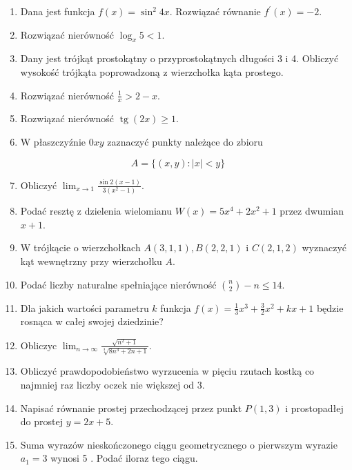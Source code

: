 \documentclass[10pt]{article}
\begin{document}
\begin{enumerate}
  \item Dana jest funkcja \(f(x)=\sin ^{2} 4 x\). Rozwiązać równanie \(f^{\prime}(x)=-2\).
  \item Rozwiązać nierówność \(\log _{x} 5<1\).
  \item Dany jest trójkąt prostokątny o przyprostokątnych długości 3 i 4. Obliczyć wysokość trójkąta poprowadzoną z wierzchołka kąta prostego.
  \item Rozwiązać nierówność \(\frac{1}{x}>2-x\).
  \item Rozwiązać nierówność \(\operatorname{tg}(2 x) \geqslant 1\).
  \item W płaszczyźnie \(0 x y\) zaznaczyć punkty należące do zbioru
\end{enumerate}

\[
A=\{(x, y):|x|<y\}
\]

\begin{enumerate}
  \setcounter{enumi}{6}
  \item Obliczyć \(\lim _{x \rightarrow 1} \frac{\sin 2(x-1)}{3\left(x^{2}-1\right)}\).
  \item Podać resztę z dzielenia wielomianu \(W(x)=5 x^{4}+2 x^{2}+1\) przez dwumian \(x+1\).
  \item W trójkącie o wierzchołkach \(A(3,1,1), B(2,2,1)\) i \(C(2,1,2)\) wyznaczyć kąt wewnętrzny przy wierzchołku \(A\).
  \item Podać liczby naturalne spełniające nierówność \(\binom{n}{2}-n \leqslant 14\).
  \item Dla jakich wartości parametru \(k\) funkcja \(f(x)=\frac{1}{3} x^{3}+\frac{3}{2} x^{2}+k x+1\) będzie rosnąca w całej swojej dziedzinie?
  \item Obliczyc \(\lim _{n \rightarrow \infty} \frac{\sqrt{n^{2}+1}}{\sqrt[3]{8 n^{3}+2 n+1}}\).
  \item Obliczyć prawdopodobieństwo wyrzucenia w pięciu rzutach kostką co najmniej raz liczby oczek nie większej od 3.
  \item Napisać równanie prostej przechodzącej przez punkt \(P(1,3)\) i prostopadłej do prostej \(y=2 x+5\).
  \item Suma wyrazów nieskończonego ciągu geometrycznego o pierwszym wyrazie \(a_{1}=3\) wynosi 5 . Podać iloraz tego ciągu.
\end{enumerate}
\end{document}
